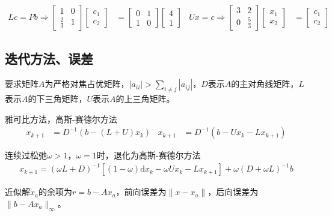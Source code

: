 \documentclass[twocolumn]{article}
\begin{document}
\begin{align*}
    Lc=Pb\Rightarrow
    \begin{bmatrix}
        1           & 0 \\
        \frac{2}{3} & 1
    \end{bmatrix}
    \begin{bmatrix}
        c_1 \\
        c_2
    \end{bmatrix}
     & =
    \begin{bmatrix}
        0 & 1 \\
        1 & 0
    \end{bmatrix}
    \begin{bmatrix}
        4 \\
        1
    \end{bmatrix}
     &
    Ux=c \Rightarrow
    \begin{bmatrix}
        3 & 2           \\
        0 & \frac{5}{3}
    \end{bmatrix}
    \begin{bmatrix}
        x_1 \\
        x_2
    \end{bmatrix}
     & =
    \begin{bmatrix}
        c_1 \\
        c_2
    \end{bmatrix}
\end{align*}

\subsection{迭代方法、误差}
要求矩阵$A$为严格对焦占优矩阵，$|a_{ii}|>\sum_{i\neq j}|a_{ij}|$，$D$表示$A$的主对角线矩阵，$L$表示$A$的下三角矩阵，$U$表示$A$的上三角矩阵。

雅可比方法，高斯-赛德尔方法
\begin{align*}
    x_{k+1}&=D^{-1}(b-(L+U)x_k)&    x_{k+1}&=D^{-1}(b-Ux_k-Lx_{k+1})
\end{align*}

连续过松弛$\omega>1$，$\omega=1$时，退化为高斯-赛德尔方法
\begin{align*}
    x_{k+1}=(\omega L+D)^{-1}[(1-\omega)\mathrm{d}x_k-\omega Ux_k-Lx_{k+1}]+\omega(D+\omega L)^{-1}b
\end{align*}

近似解$x_a$的余项为$r=b-Ax_a$，前向误差为$\|x-x_a\|$，后向误差为$\|b-Ax_a\|_\infty$。
\end{document}

